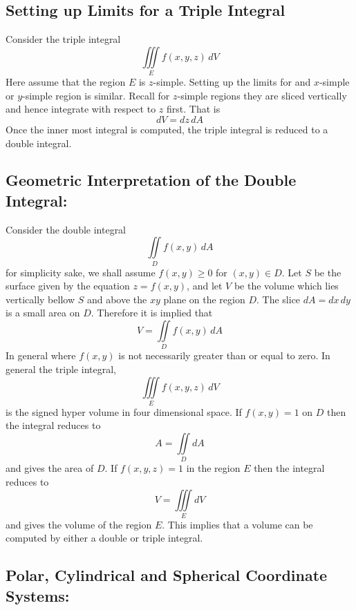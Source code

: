 \documentclass[14pt]{article}
\begin{document}
    \subsection{Setting up Limits for a Triple Integral}
    Consider the triple integral
    $$\iiint \limits_E f(x,y,z)\, dV$$
    Here assume that the region $E$ is $z$-simple. Setting up the limits for and $x$-simple or $y$-simple region is similar. Recall for $z$-simple regions they are sliced vertically and hence integrate with respect to $z$ first. That is
    $$dV=dz\, dA$$
    Once the inner most integral is computed, the triple integral is reduced to a double integral.
    \subsection{Geometric Interpretation of the Double Integral:}
    Consider the double integral
    $$\iint\limits_D f(x,y)\, dA$$
    for simplicity sake, we shall assume $f(x,y)\geq 0$ for $(x,y)\in D$. Let $S$ be the surface given by the equation $z=f(x,y)$, and let $V$ be the volume which lies vertically bellow $S$ and above the $xy$ plane on the region $D$. The slice $dA=dx\, dy$ is a small area on $D$. Therefore it is implied that
    $$V=\iint\limits_Df(x,y)\, dA$$
    In general where $f(x,y)$ is not necessarily greater than or equal to zero. In general the triple integral, 
    $$\iiint\limits_Ef(x,y,z)\, dV$$
    is the signed hyper volume in four dimensional space. If $f(x,y)=1$ on $D$ then the integral reduces to
    $$A=\iint\limits_D dA$$
    and gives the area of $D$. If $f(x,y,z)=1$ in the region $E$ then the integral reduces to
    $$V=\iiint\limits_EdV$$
    and gives the volume of the region $E$. This implies that a volume can be computed by either a double or triple integral.
    \subsection{Polar, Cylindrical and Spherical Coordinate Systems:}
\end{document}
